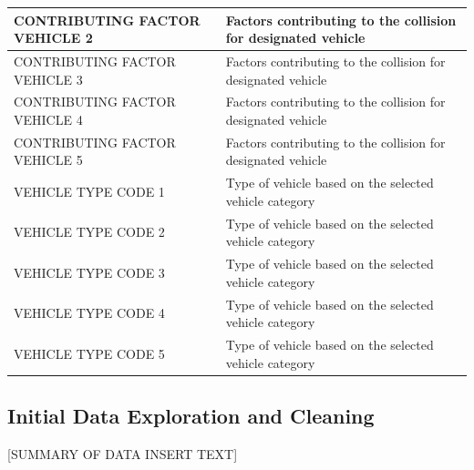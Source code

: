 \begin{table}
\begin{tabular}[t]{l|l}
\hline
CONTRIBUTING FACTOR VEHICLE 2 & Factors contributing to the collision for designated vehicle\\
\hline
CONTRIBUTING FACTOR VEHICLE 3 & Factors contributing to the collision for designated vehicle\\
\hline
CONTRIBUTING FACTOR VEHICLE 4 & Factors contributing to the collision for designated vehicle\\
\hline
CONTRIBUTING FACTOR VEHICLE 5 & Factors contributing to the collision for designated vehicle\\
\hline
VEHICLE TYPE CODE 1 & Type of vehicle based on the selected vehicle category\\
\hline
VEHICLE TYPE CODE 2 & Type of vehicle based on the selected vehicle category\\
\hline
VEHICLE TYPE CODE 3 & Type of vehicle based on the selected vehicle category\\
\hline
VEHICLE TYPE CODE 4 & Type of vehicle based on the selected vehicle category\\
\hline
VEHICLE TYPE CODE 5 & Type of vehicle based on the selected vehicle category\\
\hline
\end{tabular}
\end{table}

\newpage

\hypertarget{initial-data-exploration-and-cleaning}{%
\subsection{Initial Data Exploration and
Cleaning}\label{initial-data-exploration-and-cleaning}}

{[}SUMMARY OF DATA INSERT TEXT{]}


